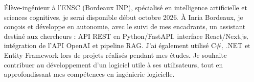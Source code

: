 
\begin{cvparagraph}
Élève-ingénieur à l’ENSC (Bordeaux INP), spécialisé en intelligence artificielle et sciences cognitives, je serai disponible début octobre 2026. À Inria Bordeaux, je conçois et développe en autonomie, avec le suivi de mes encadrants, un assistant destiné aux chercheurs : API REST en Python/FastAPI, interface React/Next.js, intégration de l’API OpenAI et pipeline RAG. J’ai également utilisé C\#, .NET et Entity Framework lors de projets réalisés pendant mes études. Je souhaite contribuer au développement d’un logiciel utile à ses utilisateurs, tout en approfondissant mes compétences en ingénierie logicielle.
\end{cvparagraph}

